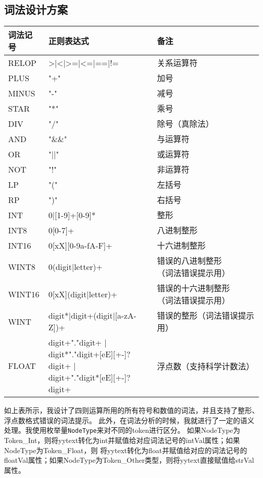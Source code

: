 \documentclass[UTF8,11pt,a4paper]{ctexart}%
\begin{document}
\subsection{词法设计方案}
\begin{center}
    \begin{longtable}{l|l|l}
        \toprule
        词法记号&正则表达式&备注\\
        \hline
        RELOP & >|<|>=|<=|==|!= & 关系运算符  \\
        \hline
        PLUS & "+" & 加号\\
        \hline
        MINUS & "-" & 减号\\
        \hline
        STAR & "*" & 乘号\\
        \hline
        DIV & "/" & 除号（真除法）\\
        \hline
        AND & "\&\&" & 与运算符\\
        \hline
        OR & "||" & 或运算符\\
        \hline
        NOT & "!" & 非运算符\\
        \hline
        LP & "(" & 左括号\\
        \hline
        RP & ")" & 右括号\\
        \hline
        INT & 0|[1-9]+[0-9]* & 整形\\
        \hline
        INT8 & 0[0-7]+ & 八进制整形\\
        \hline
        INT16 & 0[xX][0-9a-fA-F]+ & 十六进制整形\\
        \hline
        WINT8 & 0({digit}|{letter})+ & \makecell[l]{错误的八进制整形\\（词法错误提示用）}\\
        \hline
        WINT16 & 0[xX]({digit}|{letter})+& \makecell[l]{错误的十六进制整形\\ （词法错误提示用）}\\
        \hline
        WINT & {digit}*|{digit}+({digit}|[a-zA-Z])+ & 错误的整形（词法错误提示用）\\
        \hline
        FLOAT & \makecell[l]{
            {digit}+"."{digit}+ | \\
            {digit}*"."{digit}+[eE][+-]?{digit}+ | \\
            {digit}+"."{digit}*[eE][+-]?{digit}+ \\
            }
            & 浮点数（支持科学计数法）\\
        \bottomrule
    \end{longtable}
\end{center}
\hspace{2em}如上表所示，我设计了四则运算所用的所有符号和数值的词法，并且支持了整形、浮点数格式错误的词法提示。
此外，在词法分析的时候，我就进行了一定的语义处理。我使用枚举量\texttt{NodeType}来对不同的token进行区分。
如果NodeType为Token\_Int，则将yytext转化为int并赋值给对应词法记号的intVal属性；如果NodeType为Token\_Float，则
将yytext转化为float并赋值给对应的词法记号的floatVal属性；如果NodeType为Token\_Other类型，则将yytext直接赋值给strVal属性。
\end{document}
